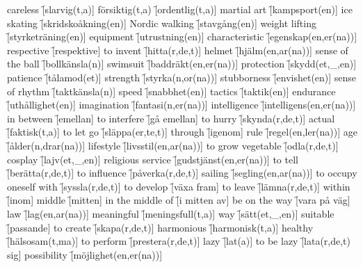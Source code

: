\begin{questions}
\begin{multicols}{2}
        \question careless \f[slarvig(t,a)]
        \question försiktig(t,a) \f[ordentlig(t,a)]
        \question martial art \f[kampsport(en)]
        \question ice skating \f[skridskoåkning(en)]
        \question Nordic walking \f[stavgång(en)]
        \question weight lifting \f[styrketräning(en)]
        \question equipment \f[utrustning(en)]
        \question characteristic \f[egenskap(en,er(na))]
        \question respective \f[respektive]
        \question to invent \f[hitta(r,de,t)]
        \question helmet \f[hjälm(en,ar(na))]
        \question sense of the ball \f[bollkänsla(n)]
        \question swimsuit \f[baddräkt(en,er(na))]
        \question protection \f[skydd(et,\_,en)]
        \question patience \f[tålamod(et)]
        \question strength \f[styrka(n,or(na))]
        \question stubborness \f[envishet(en)]
        \question sense of rhythm \f[taktkänsla(n)]
        \question speed \f[snabbhet(en)]
        \question tactics \f[taktik(en)]
        \question endurance \f[uthållighet(en)]
        \question imagination \f[fantasi(n,er(na))]
        \question intelligence \f[intelligens(en,er(na))]
        \question in between \f[emellan]
        \question to interfere \f[gå emellan]
        \question to hurry \f[skynda(r,de,t)]
        \question actual \f[faktisk(t,a)]
        \question to let go \f[släppa(er,te,t)]
        \question through \f[igenom]
        \question rule \f[regel(en,ler(na))]
        \question age \f[ålder(n,drar(na))]
        \question lifestyle \f[livsstil(en,ar(na))]
        \question to grow vegetable \f[odla(r,de,t)]
        \question cosplay \f[lajv(et,\_,en)]
        \question religious service \f[gudstjänst(en,er(na))]
        \question to tell \f[berätta(r,de,t)]
        \question to influence \f[påverka(r,de,t)]
        \question sailing \f[segling(en,ar(na))]
        \question to occupy oneself with \f[syssla(r,de,t)]
        \question to develop \f[växa fram]
        \question to leave \f[lämna(r,de,t)]
        \question within \f[inom]
        \question middle \f[mitten]
        \question in the middle of \f[i mitten av]
        \question be on the way \f[vara på väg]
        \question law \f[lag(en,ar(na))]
        \question meaningful \f[meningsfull(t,a)]
        \question way \f[sätt(et,\_,en)]
        \question suitable \f[passande]
        \question to create \f[skapa(r,de,t)]
        \question harmonious \f[harmonisk(t,a)]
        \question healthy \f[hälsosam(t,ma)]
        \question to perform \f[prestera(r,de,t)]
        \question lazy \f[lat(a)]
        \question to be lazy \f[lata(r,de,t) sig]
        \question possibility \f[möjlighet(en,er(na))]

\end{multicols}
\end{questions}
